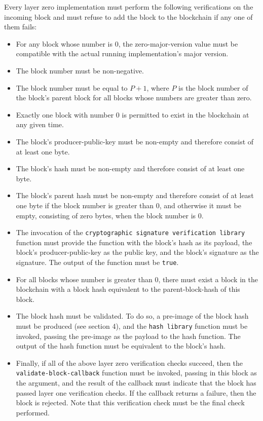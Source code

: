 \documentclass[12pt]{article}
\begin{document}
Every layer zero implementation must perform the following verifications on the incoming block and must refuse to add the block to the blockchain if any one of them fails:
\begin{itemize}
\item For any block whose number is $0$, the zero-major-version value must be compatible with the actual running implementation's major version.
\item The block number must be non-negative.
\item The block number must be equal to $P + 1$, where $P$ is the block number of the block's parent block for all blocks whose numbers are greater than zero.
\item Exactly one block with number $0$ is permitted to exist in the blockchain at any given time.
\item The block's producer-public-key must be non-empty and therefore consist of at least one byte.
\item The block's hash must be non-empty and therefore consist of at least one byte.
\item The block's parent hash must be non-empty and therefore consist of at least one byte if the block number is greater than $0$, and otherwise it must be empty, consisting of zero bytes, when the block number is $0$.
\item The invocation of the \texttt{cryptographic signature verification library} function must provide the function with the block's hash as its payload, the block's producer-public-key as the public key, and the block's signature as the signature. The output of the function must be \texttt{true}.
\item For all blocks whose number is greater than $0$, there must exist a block in the blockchain with a block hash equivalent to the parent-block-hash of this block.
\item The block hash must be validated. To do so, a pre-image of the block hash must be produced (see section 4), and the \texttt{hash library} function must be invoked, passing the pre-image as the payload to the hash function. The output of the hash function must be equivalent to the block's hash.
\item Finally, if all of the above layer zero verification checks succeed, then the \texttt{validate-block-callback} function must be invoked, passing in this block as the argument, and the result of the callback must indicate that the block has passed layer one verification checks. If the callback returns a failure, then the block is rejected. Note that this verification check must be the final check performed.
\end{itemize}
\end{document}
